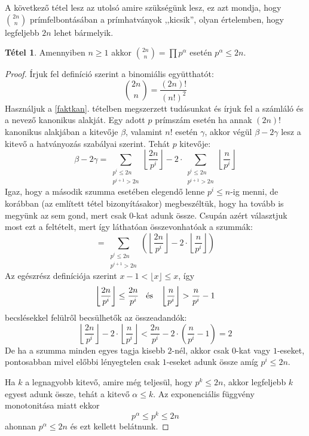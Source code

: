 \documentclass[12pt]{book}
\theoremstyle{plain} %
\theoremstyle{definition} %
\newtheorem{theo/}{Tétel}[section]
\newenvironment{theo}
  {\renewcommand{\qedsymbol}{$\clubsuit$}%
   \pushQED{\qed}\begin{theo/}}
  {\popQED\end{theo/}}
\theoremstyle{remark}
\renewcommand\qedsymbol{$\blacksquare$}
\numberwithin{equation}{section}  %
\begin{document}
	A következő tétel lesz az utolsó amire szükségünk lesz, ez azt mondja, hogy ${2n\choose n}$ prímfelbontásában a prímhatványok ,,kicsik'', olyan értelemben, hogy legfeljebb $2n$ lehet bármelyik.

	\begin{theo}\label{otodik}
		Amennyiben $n\geq 1$ akkor ${2n\choose n} = \displaystyle\prod p^{\alpha}$ esetén $p^{\alpha} \leq 2n$.
	\end{theo}

	\begin{proof}
		Írjuk fel definíció szerint a binomiális együtthatót:
		\[ {2n\choose n} = \dfrac{(2n)!}{(n!)^2}  \]
		Használjuk a \ref{faktkan}. tételben megszerzett tudásunkat és írjuk fel a számláló és a nevező kanonikus alakját. Egy adott $p$ prímszám esetén ha annak $(2n)!$ kanonikus alakjában a kitevője $\beta$, valamint $n!$ esetén $\gamma$, akkor végül $\beta-2\gamma$ lesz a kitevő a hatványozás szabályai szerint. Tehát $p$ kitevője:
		\[ \beta - 2\gamma = \sum\limits_{\substack{p^i\leq 2n \\ p^{i+1}>2n}} \left \lfloor \dfrac{2n}{p^i} \right \rfloor - 2 \cdot \sum\limits_{\substack{p^i\leq 2n \\ p^{i+1}>2n}} \left \lfloor \dfrac{n}{p^i} \right \rfloor  \]
		Igaz, hogy a második szumma esetében elegendő lenne $p^i\leq n$-ig menni, de korábban (az említett tétel bizonyításakor) megbeszéltük, hogy ha tovább is megyünk az sem gond, mert csak $0$-kat adunk össze. Csupán azért választjuk most ezt a feltételt, mert így láthatóan összevonhatóak a szummák:
		\[ = \sum\limits_{\substack{p^i\leq 2n \\ p^{i+1}>2n}} \left( \left \lfloor \dfrac{2n}{p^i} \right \rfloor - 2\cdot  \left \lfloor \dfrac{n}{p^i} \right \rfloor \right) \]
		Az egészrész definíciója szerint $x-1< \lfloor x \rfloor \leq x$, így
		\[ \left \lfloor \dfrac{2n}{p^i} \right \rfloor \leq \dfrac{2n}{p^i} \hspace{3mm} \text{és} \hspace{3mm}   \left \lfloor \dfrac{n}{p^i} \right \rfloor > \dfrac{n}{p^i} - 1  \]
		becslésekkel felülről becsülhetők az összeadandók:
		\[  \left \lfloor \dfrac{2n}{p^i} \right \rfloor - 2\cdot  \left \lfloor \dfrac{n}{p^i} \right \rfloor < \dfrac{2n}{p^i} - 2\cdot \left( \dfrac{n}{p^i} - 1 \right)  =  2  \]
		De ha a szumma minden egyes tagja kisebb $2$-nél, akkor csak $0$-kat vagy $1$-eseket, pontosabban mivel előbbi lényegtelen csak $1$-eseket adunk össze amíg $p^i\leq 2n$.
		
		Ha $k$ a legnagyobb kitevő, amire még teljesül, hogy $p^k\leq 2n$, akkor legfeljebb $k$ egyest adunk össze, tehát a kitevő $\alpha \leq k$. Az exponenciális függvény monotonitása miatt ekkor
		\[ p^\alpha \leq p^k \leq 2n  \]
		ahonnan $p^\alpha \leq 2n$ és ezt kellett belátnunk.
	\end{proof}
\end{document}
